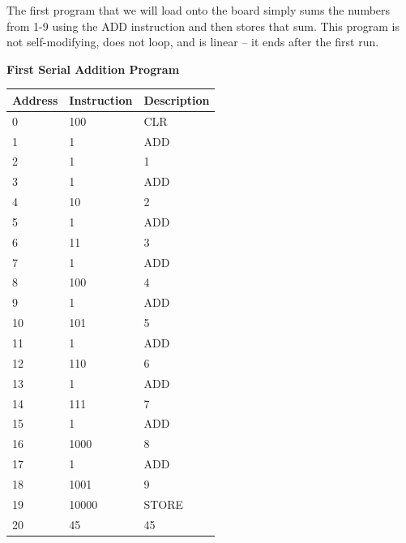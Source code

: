 \documentclass[12pt]{article}
\begin{document}
The first program that we will load onto the board simply sums the numbers from 1-9 using the ADD instruction and then stores that sum. This program is not self-modifying, does not loop, and is linear -- it ends after the first run.
\begin{center}
\textbf{First Serial Addition Program}\\
\begin{tabular}{|l|l|l|}
\hline
Address & Instruction & Description\\
\hline
0       & 100	&CLR    \\
1       & 1		&ADD    \\
2       & 1		&1      \\
3       & 1		&ADD    \\
4       & 10	&2      \\
5       & 1		&ADD    \\
6       & 11	&3      \\
7       & 1		&ADD    \\
8       & 100	&4      \\
9       & 1		&ADD    \\
10      & 101	&5      \\
11      & 1		&ADD    \\
12      & 110	&6      \\
13      & 1		&ADD    \\
14      & 111	&7      \\
15      & 1		&ADD    \\
16      & 1000	&8      \\
17      & 1		&ADD    \\
18      & 1001	&9      \\
19      & 10000	&STORE 	\\
20      & 45	&45		\\
\hline
\end{tabular}
\end{center}
\end{document}
